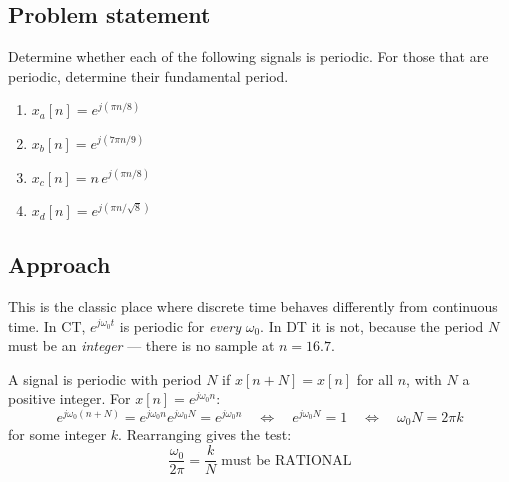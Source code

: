 





\subsection*{Problem statement}

Determine whether each of the following signals is periodic. For those that are
periodic, determine their fundamental period.
\begin{enumerate}
  \item $x_a[n] = e^{j(\pi n/8)}$
  \item $x_b[n] = e^{j(7\pi n/9)}$
  \item $x_c[n] = n\,e^{j(\pi n/8)}$
  \item $x_d[n] = e^{j(\pi n/\sqrt{8})}$
\end{enumerate}

\subsection*{Approach}

This is the classic place where discrete time behaves differently from
continuous time. In CT, $e^{j\omega_0 t}$ is periodic for \emph{every}
$\omega_0$. In DT it is not, because the period $N$ must be an \emph{integer} —
there is no sample at $n = 16.7$.

A signal is periodic with period $N$ if $x[n+N] = x[n]$ for all $n$, with $N$ a
positive integer. For $x[n] = e^{j\omega_0 n}$:
\begin{equation}
  e^{j\omega_0 (n+N)} = e^{j\omega_0 n} e^{j\omega_0 N} = e^{j\omega_0 n}
  \quad\Longleftrightarrow\quad
  e^{j\omega_0 N} = 1
  \quad\Longleftrightarrow\quad
  \omega_0 N = 2\pi k
\end{equation}
for some integer $k$. Rearranging gives the test:
\begin{equation}
  \boxed{\;\frac{\omega_0}{2\pi} = \frac{k}{N} \;\text{must be RATIONAL}\;}
  \label{eq:rational-test}
\end{equation}

